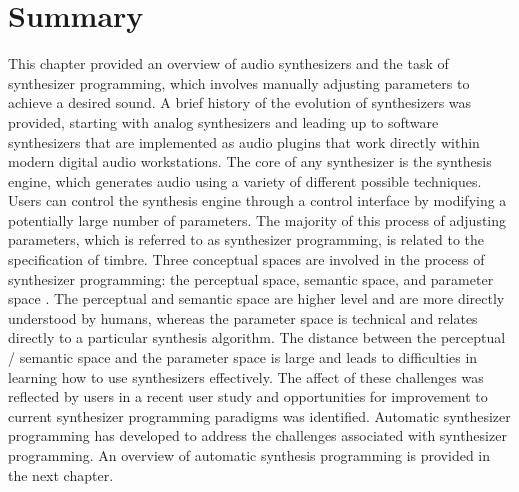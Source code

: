 \section{Summary}
This chapter provided an overview of audio synthesizers and the task of synthesizer programming, which involves manually adjusting parameters to achieve a desired sound. A brief history of the evolution of synthesizers was provided, starting with analog synthesizers and leading up to software synthesizers that are implemented as audio plugins that work directly within modern digital audio workstations. The core of any synthesizer is the synthesis engine, which generates audio using a variety of different possible techniques. Users can control the synthesis engine through a control interface by modifying a potentially large number of parameters. The majority of this process of adjusting parameters, which is referred to as synthesizer programming, is related to the specification of timbre. Three conceptual spaces are involved in the process of synthesizer programming: the perceptual space, semantic space, and parameter space \cite{pardo2019learning}. The perceptual and semantic space are higher level and are more directly understood by humans, whereas the parameter space is technical and relates directly to a particular synthesis algorithm. The distance between the perceptual / semantic space and the parameter space is large and leads to difficulties in learning how to use synthesizers effectively. The affect of these challenges was reflected by users in a recent user study \cite{krekovic2019insights} and opportunities for improvement to current synthesizer programming paradigms was identified. Automatic synthesizer programming has developed to address the challenges associated with synthesizer programming. An overview of automatic synthesis programming is provided in the next chapter.